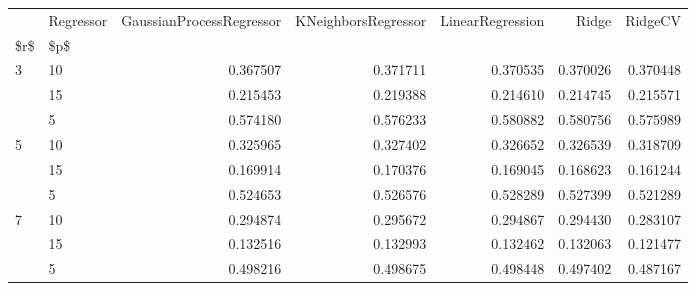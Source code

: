 \begin{tabular}{llrrrrr}
\toprule
  & Regressor &  GaussianProcessRegressor &  KNeighborsRegressor &  LinearRegression &     Ridge &   RidgeCV \\
\$r\$ & \$p\$ &                           &                      &                   &           &           \\
\midrule
3 & 10 &                  0.367507 &             0.371711 &          0.370535 &  0.370026 &  0.370448 \\
  & 15 &                  0.215453 &             0.219388 &          0.214610 &  0.214745 &  0.215571 \\
  & 5 &                  0.574180 &             0.576233 &          0.580882 &  0.580756 &  0.575989 \\
5 & 10 &                  0.325965 &             0.327402 &          0.326652 &  0.326539 &  0.318709 \\
  & 15 &                  0.169914 &             0.170376 &          0.169045 &  0.168623 &  0.161244 \\
  & 5 &                  0.524653 &             0.526576 &          0.528289 &  0.527399 &  0.521289 \\
7 & 10 &                  0.294874 &             0.295672 &          0.294867 &  0.294430 &  0.283107 \\
  & 15 &                  0.132516 &             0.132993 &          0.132462 &  0.132063 &  0.121477 \\
  & 5 &                  0.498216 &             0.498675 &          0.498448 &  0.497402 &  0.487167 \\
\bottomrule
\end{tabular}
